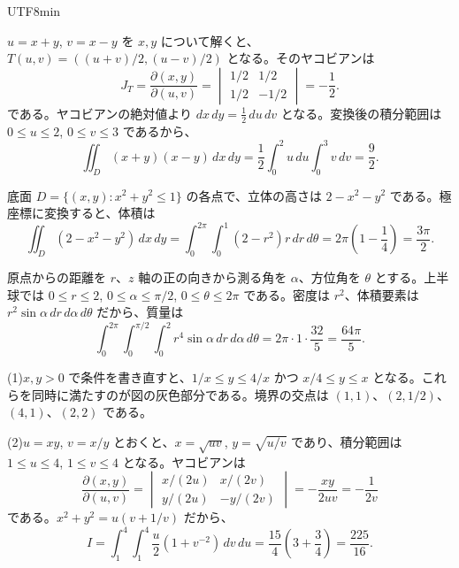 \documentclass[a4paper,12pt]{article}
\newcommand{\ans}[1]{\par\vspace{0.8em}\noindent{\large 問題 #1}\quad}
\begin{document}
\begin{CJK}{UTF8}{min}
\newpage
\ans{6}
$u=x+y$, $v=x-y$ を $x,y$ について解くと、$T(u,v)=\left((u+v)/2,(u-v)/2\right)$ となる。そのヤコビアンは
$$
J_T=\frac{\partial(x,y)}{\partial(u,v)}
=\begin{vmatrix}1/2&1/2\\1/2&-1/2\end{vmatrix}=-\frac12 .
$$
である。ヤコビアンの絶対値より $dx\,dy=\tfrac12\,du\,dv$ となる。変換後の積分範囲は $0\le u\le 2$, $0\le v\le 3$ であるから、
$$
\iint_D(x+y)(x-y)\,dx\,dy
=\frac12\int_0^2 u\,du\int_0^3 v\,dv=\frac92 .
$$

\ans{7}
底面 $D=\{(x,y):x^2+y^2\le 1\}$ の各点で、立体の高さは $2-x^2-y^2$ である。極座標に変換すると、体積は
$$
\iint_D(2-x^2-y^2)\,dx\,dy
=\int_0^{2\pi}\!\int_0^1(2-r^2)r\,dr\,d\theta
=2\pi\left(1-\frac14\right)=\frac{3\pi}{2}.
$$

\ans{8}
原点からの距離を $r$、$z$ 軸の正の向きから測る角を $\alpha$、方位角を $\theta$ とする。上半球では $0\le r\le 2$, $0\le\alpha\le\pi/2$, $0\le\theta\le 2\pi$ である。密度は $r^2$、体積要素は $r^2\sin\alpha\,dr\,d\alpha\,d\theta$ だから、質量は
$$
\int_0^{2\pi}\!\int_0^{\pi/2}\!\int_0^2
r^4\sin\alpha\,dr\,d\alpha\,d\theta
=2\pi\cdot 1\cdot\frac{32}{5}=\frac{64\pi}{5}.
$$

\ans{9}\par
\noindent\begin{minipage}[c]{0.40\linewidth}
\centering
{}
\end{minipage}\hfill
\begin{minipage}[c]{0.57\linewidth}
(1)\enspace $x,y>0$ で条件を書き直すと、$1/x\le y\le 4/x$ かつ $x/4\le y\le x$ となる。これらを同時に満たすのが図の灰色部分である。境界の交点は $(1,1)$、$(2,1/2)$、$(4,1)$、$(2,2)$ である。
\end{minipage}

(2)\enspace $u=xy$, $v=x/y$ とおくと、$x=\sqrt{uv}$, $y=\sqrt{u/v}$ であり、積分範囲は $1\le u\le4$, $1\le v\le4$ となる。ヤコビアンは
$$
\frac{\partial(x,y)}{\partial(u,v)}
=\begin{vmatrix}x/(2u)&x/(2v)\\y/(2u)&-y/(2v)\end{vmatrix}
=-\frac{xy}{2uv}=-\frac{1}{2v}
$$
である。$x^2+y^2=u(v+1/v)$ だから、
$$
I=\int_1^4\!\int_1^4\frac u2(1+v^{-2})\,dv\,du
=\frac{15}{4}\left(3+\frac34\right)=\frac{225}{16}.
$$


\end{CJK}
\end{document}
